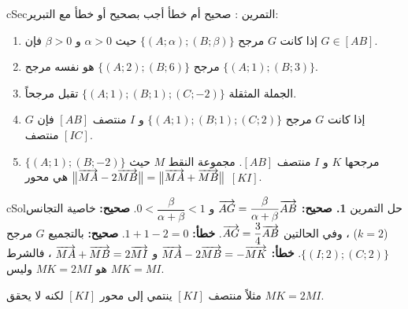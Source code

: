 \documentclass[12pt,a4paper]{article}
\newenvironment{BOX}[2]{\begin{otherlanguage}{english}\begin{arbox}{#1}{#2}}{\end{arbox}\end{otherlanguage}}
\newcounter{exo}
\newenvironment{tamrin}[1]{\stepcounter{exo}\begin{BOX}{cSec}{التمرين \theexo: #1}}{\end{BOX}}
\newenvironment{hal}{\Needspace{12\baselineskip}\begin{otherlanguage}{english}\begin{arbox}[breakable]{cSol}{حل التمرين \theexo}}{\end{arbox}\end{otherlanguage}}
\begin{document}
\begin{tamrin}{صحيح أم خطأ}
أجب بصحيح أو خطأ مع التبرير:
\begin{enumerate}
\item إذا كانت $G$ مرجح $\{(A;\alpha);(B;\beta)\}$ حيث $\alpha>0$ و $\beta>0$ فإن $G\in[AB]$.
\item مرجح $\{(A;2);(B;6)\}$ هو نفسه مرجح $\{(A;1);(B;3)\}$.
\item الجملة المثقلة $\{(A;1);(B;1);(C;-2)\}$ تقبل مرجحاً.
\item إذا كانت $G$ مرجح $\{(A;1);(B;1);(C;2)\}$ و $I$ منتصف $[AB]$ فإن $G$ منتصف $[IC]$.
\item $\{(A;1);(B;-2)\}$ مرجحها $K$ و $I$ منتصف $[AB]$. مجموعة النقط $M$ حيث $\big\|\overrightarrow{MA}-2\overrightarrow{MB}\big\|=\big\|\overrightarrow{MA}+\overrightarrow{MB}\big\|$ هي محور $[KI]$.
\end{enumerate}
\end{tamrin}
\begin{hal}
\textbf{1. صحيح:} $\overrightarrow{AG}=\dfrac{\beta}{\alpha+\beta}\overrightarrow{AB}$ و $0<\dfrac{\beta}{\alpha+\beta}<1$.
 \textbf{صحيح:} خاصية التجانس ($k=2$) ، وفي الحالتين $\overrightarrow{AG}=\dfrac34\overrightarrow{AB}$.
 \textbf{خطأ:} $1+1-2=0$.
 \textbf{صحيح:} بالتجميع $G$ مرجح $\{(I;2);(C;2)\}$.
 \textbf{خطأ:} $\overrightarrow{MA}-2\overrightarrow{MB}=-\overrightarrow{MK}$ و $\overrightarrow{MA}+\overrightarrow{MB}=2\overrightarrow{MI}$ ، فالشرط هو $MK=2MI$ وليس $MK=MI$.\par
مثلاً منتصف $[KI]$ ينتمي إلى محور $[KI]$ لكنه لا يحقق $MK=2MI$.
\end{hal}
\end{document}
